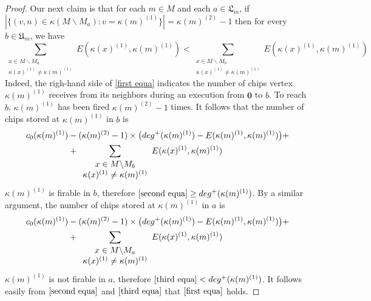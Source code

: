 \documentclass{article}
\theoremstyle{definition}
\newcommand\set[1]{\{ #1 \}}
\begin{document}
\begin{proof}
Our next claim is that for each $m \in M$ and each $a \in \mathfrak{L}_m$, if $|\set{(v,n)\in \kappa(M\backslash M_a):v=\kappa(m)^{(1)}}|=\kappa(m)^{(2)}-1$ then for every $b \in \mathfrak{U}_m$, we have
\begin{equation}
\label{first equa}
\underset{\begin{array}{c} x\in M\backslash M_a\\ \kappa(x)^{(1)}\neq \kappa(m)^{(1)}  \end{array}}{\sum}E(\kappa(x)^{(1)},\kappa(m)^{(1)})< \underset{\begin{array}{c}x\in M\backslash M_b \\ \kappa(x)^{(1)}\neq \kappa(m)^{(1)}  \end{array}}{\sum}E(\kappa(x)^{(1)},\kappa(m)^{(1)})
\end{equation}
Indeed, the righ-hand side of \eqref{first equa} indicates the number of chips vertex $\kappa(m)^{(1)}$ receives from its neighbors during an execution from $\textbf{0}$ to $b$. To reach $b$, $\kappa(m)^{(1)}$ has been fired $\kappa(m)^{(2)}-1$ times. It follows that the number of chips stored at $\kappa(m)^{(1)}$ in $b$ is
\begin{align}
\label{second equa}
\notag c_0(\kappa(m)^{(1)})&-(\kappa(m)^{(2)}-1)\times \big(deg^{+}(\kappa(m)^{(1)})-E(\kappa(m)^{(1)},\kappa(m)^{(1)})\big)+\\
&+\underset{\begin{array}{c}x\in M\backslash M_b \\ \kappa(x)^{(1)}\neq \kappa(m)^{(1)}  \end{array}}{\sum}E(\kappa(x)^{(1)},\kappa(m)^{(1)})
\end{align}
$\kappa(m)^{(1)}$ is firable in $b$, therefore $\eqref{second equa}\geq deg^{+}(\kappa(m)^{(1)})$. By a similar argument, the number of chips stored at $\kappa(m)^{(1)}$ in $a$ is
\begin{align}
\label{third equa}
\notag c_0(\kappa(m)^{(1)})&-(\kappa(m)^{(2)}-1)\times \big(deg^{+}(\kappa(m)^{(1)})-E(\kappa(m)^{(1)},\kappa(m)^{(1)})\big)+\\
&+\underset{\begin{array}{c} x\in M\backslash M_a\\ \kappa(x)^{(1)}\neq \kappa(m)^{(1)}  \end{array}}{\sum}E(\kappa(x)^{(1)},\kappa(m)^{(1)})
\end{align}
$\kappa(m)^{(1)}$ is not firable in $a$, therefore $\eqref{third equa}<deg^{+}(\kappa(m)^{(1)})$. It follows easily from $\eqref{second equa}$ and $\eqref{third equa}$ that $\eqref{first equa}$ holds. 


\end{proof}
\end{document}
